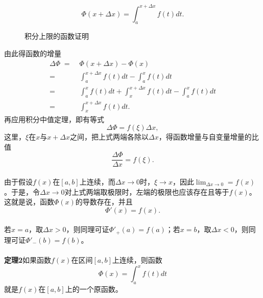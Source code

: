 \begin{equation*}
  \Phi(x+\Delta x) = \int_a^{x+\Delta x}f(t)dt.
\end{equation*}

\begin{figure}[H]
\centering
  
  \caption{积分上限的函数证明}
  \label{积分上限的函数证明}
\end{figure}

由此得函数的增量
\begin{align*}
\Delta\Phi \;=&\; \Phi(x+\Delta x) - \Phi(x) \\
  =&\; \int_a^{x+\Delta x}f(t)dt - \int_a^xf(t)dt \\
  =&\; \int_a^xf(t)dt + \int_x^{x+\Delta x}f(t)dt - \int_a^xf(t)dt \\
  =&\; \int_x^{x+\Delta x}f(t)dt.
\end{align*}
再应用积分中值定理，即有等式
\begin{equation*}
  \Delta\Phi = f(\xi)\Delta x,
\end{equation*}
这里，$\xi$在$x$与$x+\Delta x$之间，把上式两端各除以$\Delta x$，得函数增量与自变量增量的比值
\begin{equation*}
  \frac{\Delta\Phi}{\Delta x} = f(\xi).
\end{equation*}

\paragraph{}
由于假设$f(x)$在$[a,b]$上连续，而$\Delta x \to 0$时，$\xi \to x$，因此$\displaystyle\lim_{\Delta x \to 0}=f(x)$。于是，令$\Delta x \to 0$对上式两端取极限时，左端的极限也应该存在且等于$f(x)$。这就是说，函数$\Phi(x)$的导数存在，并且
\begin{equation*}
  \Phi'(x) = f(x).
\end{equation*}

\paragraph{}
若$x=a$，取$\Delta x > 0$，则同理可证$\Phi'_+(a) = f(a)$；若$x=b$，取$\Delta x < 0$，则同理可证$\Phi'_-(b)=f(b)$。

\paragraph{}
\label{积分上限的函数}
\textbf{定理2\;}如果函数$f(x)$在区间$[a,b]$上连续，则函数
\begin{equation}
  \label{积分上限函数的定义式}
  \Phi(x)=\int_a^xf(t)dt
\end{equation}
就是$f(x)$在$[a,b]$上的一个原函数。

